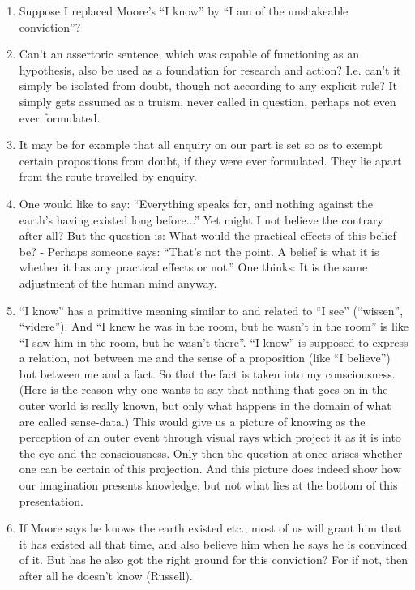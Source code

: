 \documentclass{book}
\begin{document}
\begin{enumerate}
\item
Suppose I replaced Moore's ``I know'' by ``I am of the unshakeable
conviction''?

\item
Can't an assertoric sentence, which was capable of functioning as an
hypothesis, also be used as a foundation for research and action? I.e. can't it
simply be isolated from doubt, though not according to any explicit rule? It
simply gets assumed as a truism, never called in question, perhaps not even
ever formulated.

\item
It may be for example that all enquiry on our part is set so as to exempt
certain propositions from doubt, if they were ever formulated. They lie apart
from the route travelled by enquiry.

\item
One would like to say: ``Everything speaks for, and nothing against the earth's
having existed long before...'' Yet might I not believe the contrary after all?
But the question is: What would the practical effects of this belief be? -
Perhaps someone says: ``That's not the point. A belief is what it is whether it
has any practical effects or not.'' One thinks: It is the same adjustment of
the human mind anyway.

\item
``I know'' has a primitive meaning similar to and related to ``I see''
(``wissen'', ``videre''). And ``I knew he was in the room, but he wasn't in the
room'' is like ``I saw him in the room, but he wasn't there''. ``I know'' is
supposed to express a relation, not between me and the sense of a proposition
(like ``I believe'') but between me and a fact. So that the fact is taken into
my consciousness. (Here is the reason why one wants to say that nothing that
goes on in the outer world is really known, but only what happens in the domain
of what are called sense-data.) This would give us a picture of knowing as the
perception of an outer event through visual rays which project it as it is into
the eye and the consciousness. Only then the question at once arises whether
one can be certain of this projection. And this picture does indeed show how
our imagination presents knowledge, but not what lies at the bottom of this
presentation.

\item
If Moore says he knows the earth existed etc., most of us will grant him that
it has existed all that time, and also believe him when he says he is convinced
of it. But has he also got the right ground for this conviction? For if not,
then after all he doesn't know (Russell).


\end{enumerate}
\end{document}
